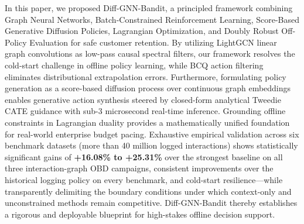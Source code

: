 \documentclass[preprint,12pt,3p]{elsarticle}
\begin{document}
In this paper, we proposed Diff-GNN-Bandit, a principled framework combining Graph Neural Networks, Batch-Constrained Reinforcement Learning, Score-Based Generative Diffusion Policies, Lagrangian Optimization, and Doubly Robust Off-Policy Evaluation for safe customer retention. By utilizing LightGCN linear graph convolutions as low-pass causal spectral filters, our framework resolves the cold-start challenge in offline policy learning, while BCQ action filtering eliminates distributional extrapolation errors. Furthermore, formulating policy generation as a score-based diffusion process over continuous graph embeddings enables generative action synthesis steered by closed-form analytical Tweedie CATE guidance with sub-3 microsecond real-time inference. Grounding offline constraints in Lagrangian duality provides a mathematically unified foundation for real-world enterprise budget pacing. Exhaustive empirical validation across six benchmark datasets (more than 40 million logged interactions) shows statistically significant gains of \textbf{+16.08\% to +25.31\%} over the strongest baseline on all three interaction-graph OBD campaigns, consistent improvements over the historical logging policy on every benchmark, and cold-start resilience---while transparently delimiting the boundary conditions under which context-only and unconstrained methods remain competitive. Diff-GNN-Bandit thereby establishes a rigorous and deployable blueprint for high-stakes offline decision support.



\end{document}
